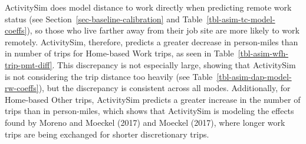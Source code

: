 \documentclass[fancy, twoside, mastersfancy, ms]{byuthesis}
\begin{document}
ActivitySim does model distance to work directly when predicting remote
work status (see Section~\ref{sec-baseline-calibration} and
Table~\ref{tbl-asim-tc-model-coeffs}), so those who live farther away
from their job site are more likely to work remotely. ActivitySim,
therefore, predicts a greater decrease in person-miles than in number of
trips for Home-based Work trips, as seen in
Table~\ref{tbl-asim-wfh-trip-pmt-diff}. This discrepancy is not
especially large, showing that ActivitySim is not considering the trip
distance too heavily (see Table~\ref{tbl-asim-dap-model-rw-coeffs}), but
the discrepancy is consistent across all modes. Additionally, for
Home-based Other trips, ActivitySim predicts a greater increase in the
number of trips than in person-miles, which shows that ActivitySim is
modeling the effects found by Moreno and Moeckel (2017) and Moeckel
(2017), where longer work trips are being exchanged for shorter
discretionary trips.
\end{document}

